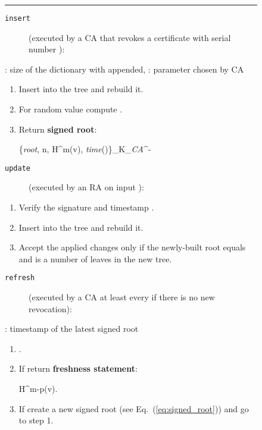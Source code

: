 \begin{figure}
	\centering
	\footnotesize
	\setlength{\tabcolsep}{10pt}
	\noindent\rule{\linewidth}{0.5pt}

	\begin{description}
		\item[\texttt{insert}] (executed by a CA that revokes a certificate with
      serial number ):
	\end{description}

	 : size of the dictionary with  appended, \quad  : parameter chosen
  by CA

	\begin{enumerate}
	  \item Insert  into the tree and rebuild it.
	  \item For random value  compute .
	  \item Return \textbf{signed root}:
	    \begin{centredequ}\label{eq:signed_root}
	      \{\textit{root}, n, H^m(v), \textit{time}()\}_{K_{\textit{CA}}^{-}}
	    \end{centredequ}
	\end{enumerate}

	\begin{description}
		\item[\texttt{update}] (executed by an RA on input
      ):
	\end{description}

	\begin{enumerate}
	  \item Verify the signature and timestamp .
	  \item Insert  into the tree and rebuild it.
	  \item Accept the applied changes only if the newly-built root equals
       and  is a number of leaves in the new tree.
	\end{enumerate}

	\begin{description}
		\item[\texttt{refresh}] (executed by a CA at least every  if there
      is no new revocation):
	\end{description}

	\begin{description}
		\item  : timestamp of the latest signed root
	\end{description}

	\begin{enumerate}
	    \item .
	    \item If  return \textbf{freshness statement}:
	        \begin{centredequ}\label{eq:fresh_statement}
	            H^{m-p}(v).
	        \end{centredequ}
	    \item If  create a new signed root (see
	        Eq.~(\ref{eq:signed_root})) and go to step 1.
	\end{enumerate}


\end{figure}
